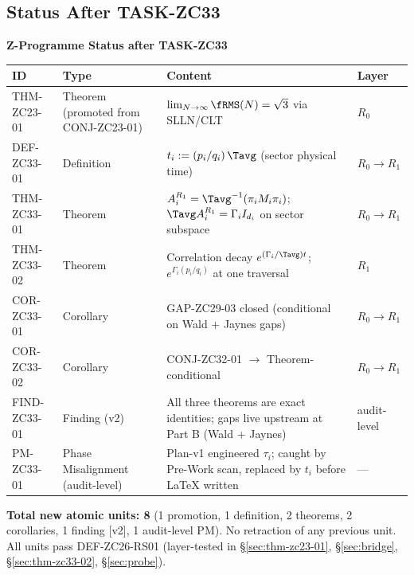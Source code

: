\documentclass[12pt, a4paper]{article}
\begin{document}
\subsection{Status After TASK-ZC33}
\label{sec:status}

{\small\color{crfgreen!20!black}\bfseries Z-Programme Status
after TASK-ZC33}
\vspace{2pt}

\begin{derivedbox}[title={Atomic units introduced by ZC33}]
{\small
\renewcommand{\arraystretch}{1.30}
\begin{tabular}{>{\raggedright\arraybackslash}p{2.6cm}
                >{\raggedright\arraybackslash}p{2.0cm}
                >{\raggedright\arraybackslash}p{6.6cm}
                >{\centering\arraybackslash}p{2.0cm}}
\toprule
\textbf{ID} & \textbf{Type} & \textbf{Content} &
  \textbf{Layer}\\
\midrule
THM-ZC23-01 & Theorem (promoted from CONJ-ZC23-01)
  & $\lim_{N\to\infty}\fRMS(N) = \sqrt{3}$ via SLLN/CLT
  & $R_0$ \\
DEF-ZC33-01 & Definition
  & $t_i := (p_i/q_i)\,\Tavg$ (sector physical time)
  & $R_0 \to R_1$ \\
THM-ZC33-01 & Theorem
  & $A_i^{R_1} = \Tavg^{-1}(\pi_i M_i \pi_i)$;
    $\Tavg A_i^{R_1} = \Gamma_i I_{d_i}$ on sector subspace
  & $R_0 \to R_1$ \\
THM-ZC33-02 & Theorem
  & Correlation decay $e^{(\Gamma_i/\Tavg) t}$;
    $e^{\Gamma_i(p_i/q_i)}$ at one traversal
  & $R_1$ \\
COR-ZC33-01 & Corollary
  & GAP-ZC29-03 closed (conditional on Wald + Jaynes gaps)
  & $R_0 \to R_1$ \\
COR-ZC33-02 & Corollary
  & CONJ-ZC32-01 $\to$ Theorem-conditional
  & $R_0 \to R_1$ \\
FIND-ZC33-01 & Finding (v2)
  & All three theorems are exact identities; gaps live
    upstream at Part B (Wald + Jaynes)
  & audit-level \\
PM-ZC33-01 & Phase Misalignment (audit-level)
  & Plan-v1 engineered $\tau_i$; caught by Pre-Work scan,
    replaced by $t_i$ before LaTeX written
  & --- \\
\bottomrule
\end{tabular}
}
\end{derivedbox}

\textbf{Total new atomic units: 8} (1 promotion, 1 definition,
2 theorems, 2 corollaries, 1 finding [v2], 1 audit-level PM).
No retraction of any previous unit. All units pass
DEF-ZC26-RS01 (layer-tested in §\ref{sec:thm-zc23-01},
§\ref{sec:bridge}, §\ref{sec:thm-zc33-02}, §\ref{sec:probe}).
\end{document}
